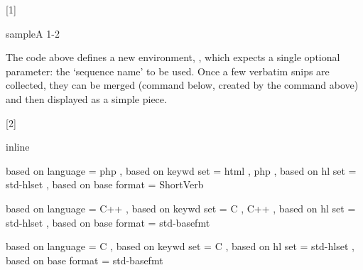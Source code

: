 [1]


\begin{codestore}[demo02]


\DemoStoreMerge {\mymerged} {sampleA} {1-2}
\hlDisplayV \mymerged
\end{codestore}
 
 The code above defines a new environment, , which expects a single optional parameter: the `sequence name' to be used.
Once a few verbatim snips are collected, they can be merged (command \tsobj{\DemoStoreMerge} below, created by the command  above) and then displayed as a simple piece. 

 [2]
 


\begin{codestore}[demoSettings]
    { inline }
\end{codestore}

\begin{codestore}[demoSettings]
    {
      based on language    = { php }  ,
      based on keywd set   = { html , php }  ,
      based on hl set      = { std-hlset }  ,
      based on base format = { ShortVerb } 
    }
\end{codestore}
    
\begin{codestore}[demoSettings]
    {
      based on language    = { C++ }  ,
      based on keywd set   = { C , C++ }  ,
      based on hl set      = { std-hlset }  ,
      based on base format = { std-basefmt } 
    }
\end{codestore} 

\begin{codestore}[demoSettings]
    {
      based on language    = { C }  ,
      based on keywd set   = { C }  ,
      based on hl set      = { std-hlset }  ,
      based on base format = { std-basefmt } 
    }
\end{codestore} 


